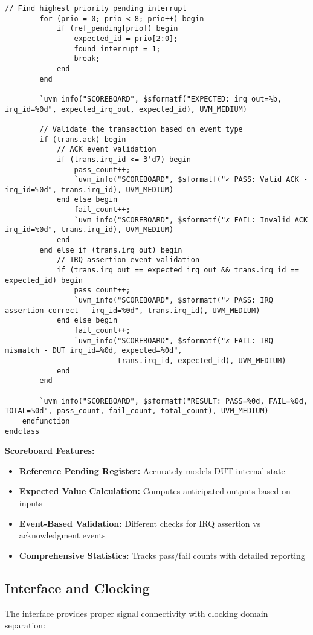 \documentclass[12pt,a4paper]{article}
\begin{document}
\begin{lstlisting}[caption=Scoreboard with Reference Model, label=lst:scoreboard]
        // Find highest priority pending interrupt
        for (prio = 0; prio < 8; prio++) begin
            if (ref_pending[prio]) begin
                expected_id = prio[2:0];
                found_interrupt = 1;
                break;
            end
        end
        
        `uvm_info("SCOREBOARD", $sformatf("EXPECTED: irq_out=%b, irq_id=%0d", expected_irq_out, expected_id), UVM_MEDIUM)
        
        // Validate the transaction based on event type
        if (trans.ack) begin
            // ACK event validation
            if (trans.irq_id <= 3'd7) begin
                pass_count++;
                `uvm_info("SCOREBOARD", $sformatf("✓ PASS: Valid ACK - irq_id=%0d", trans.irq_id), UVM_MEDIUM)
            end else begin
                fail_count++;
                `uvm_info("SCOREBOARD", $sformatf("✗ FAIL: Invalid ACK irq_id=%0d", trans.irq_id), UVM_MEDIUM)
            end
        end else if (trans.irq_out) begin
            // IRQ assertion event validation
            if (trans.irq_out == expected_irq_out && trans.irq_id == expected_id) begin
                pass_count++;
                `uvm_info("SCOREBOARD", $sformatf("✓ PASS: IRQ assertion correct - irq_id=%0d", trans.irq_id), UVM_MEDIUM)
            end else begin
                fail_count++;
                `uvm_info("SCOREBOARD", $sformatf("✗ FAIL: IRQ mismatch - DUT irq_id=%0d, expected=%0d", 
                          trans.irq_id, expected_id), UVM_MEDIUM)
            end
        end
        
        `uvm_info("SCOREBOARD", $sformatf("RESULT: PASS=%0d, FAIL=%0d, TOTAL=%0d", pass_count, fail_count, total_count), UVM_MEDIUM)
    endfunction
endclass
\end{lstlisting}

\textbf{Scoreboard Features:}
\begin{itemize}
    \item \textbf{Reference Pending Register:} Accurately models DUT internal state
    \item \textbf{Expected Value Calculation:} Computes anticipated outputs based on inputs
    \item \textbf{Event-Based Validation:} Different checks for IRQ assertion vs acknowledgment events
    \item \textbf{Comprehensive Statistics:} Tracks pass/fail counts with detailed reporting
\end{itemize}

\subsection{Interface and Clocking}
The interface provides proper signal connectivity with clocking domain separation:
\end{document}
